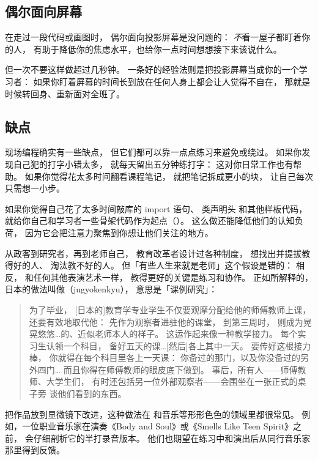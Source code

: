 \subsection*{偶尔面向屏幕}

在走过一段代码或画图时，
偶尔面向投影屏幕是没问题的：
\emph{不}看一屋子都盯着你的人，
有助于降低你的焦虑水平，也给你一点时间想想接下来该说什么。

但一次不要这样做超过几秒钟。
一条好的经验法则是把投影屏幕当成你的一个学习者：
如果你盯着屏幕的时间长到放在任何人身上都会让人觉得不自在，
那就是时候转回身、重新面对全班了。

\subsection*{缺点}

现场编程确实有一些缺点，
但它们都可以靠一点点练习来避免或绕过。
如果你发现自己犯的打字小错太多，
就每天留出五分钟练打字：
这对你日常工作也有帮助。
如果你觉得花太多时间翻看课程笔记，
就把笔记拆成更小的块，
让自己每次只需想一小步。

如果你觉得自己花了太多时间敲库的 import 语句、
类声明头
和其他样板代码，
就给你自己和学习者一些骨架代码作为起点（）。
这么做还能降低他们的认知负荷，
因为它会把注意力聚焦到你想让他们关注的地方。


从政客到研究者，再到老师自己，
教育改革者设计过各种制度，
想找出并提拔教得好的人、
淘汰教不好的人。
但「有些人生来就是老师」这个假设是错的：
相反，
和任何其他表演艺术一样，
教得更好的关键是练习和协作。
正如\cite{Gree2014}所解释的，
日本的做法叫做（jugyokenkyu），
意思是「课例研究」：

\begin{quote}

  为了毕业，
  [日本的]教育学专业学生不仅要观摩分配给他的师傅教师上课，
  还要有效地取代他：
  先作为观察者进驻他的课堂，
  到第三周时，
  则成为晃晃悠悠{\ldots}的、近似老师本人的样子。
  这运作起来像一种教学接力。
  每个实习生认领一个科目，
  备好五天的课{\ldots}[然后]各上其中一天。
  要传好这根接力棒，
  你就得在每个科目里各上一天课：
  你备过的那门，以及你没备过的另外四门{\ldots}
  而且你得在师傅教师的眼皮底下做到。
  事后，所有人——师傅教师、大学生们，
  有时还包括另一位外部观察者——会围坐在一张正式的桌子旁
  谈他们看到的东西。

\end{quote}

把作品放到显微镜下改进，这种做法在
和音乐等形形色色的领域里都很常见。
例如，一位职业音乐家在演奏《Body and Soul》或《Smells Like Teen Spirit》之前，
会仔细剖析它的半打录音版本。
他们也期望在练习中和演出后从同行音乐家那里得到反馈。

